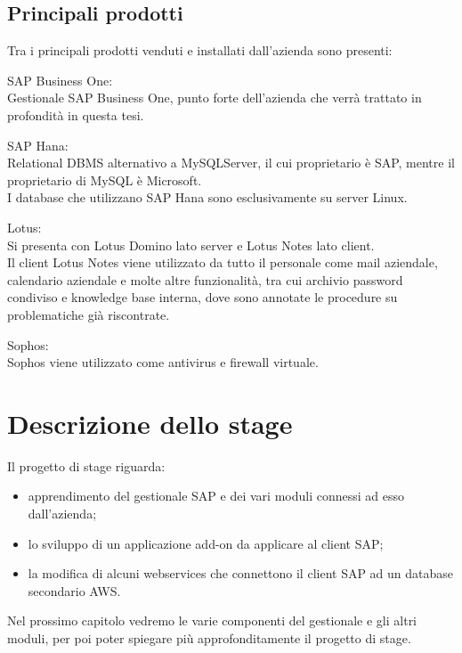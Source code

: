 \subsection{Principali prodotti}
Tra i principali prodotti venduti e installati dall'azienda sono presenti:
\begin{description}
	\item {SAP Business One:} \\Gestionale SAP Business One, punto forte dell'azienda che verrà trattato in profondità in questa tesi.
	\item {SAP Hana:} \\Relational DBMS alternativo a MySQLServer, il cui proprietario è SAP, mentre il proprietario di MySQL è Microsoft.\\I database che utilizzano SAP Hana sono esclusivamente su server Linux.
	\item {Lotus:} \\Si presenta con Lotus Domino lato server e Lotus Notes lato client.\\Il client Lotus Notes viene utilizzato da tutto il personale come mail aziendale, calendario aziendale e molte altre funzionalità, tra cui archivio password condiviso e knowledge base interna, dove sono annotate le procedure su problematiche già riscontrate.
	\item {Sophos:} \\Sophos viene utilizzato come antivirus e firewall virtuale.
\end{description}



\section{Descrizione dello stage}
Il progetto di stage riguarda:
\begin{itemize}
	\item apprendimento del gestionale SAP e dei vari moduli connessi ad esso dall'azienda;
	\item lo sviluppo di un applicazione add-on da applicare al client SAP;
	\item la modifica di alcuni webservices che connettono il client SAP ad un database secondario AWS.
\end{itemize}
Nel prossimo capitolo vedremo le varie componenti del gestionale e gli altri moduli, per poi poter spiegare più approfonditamente il progetto di stage.
